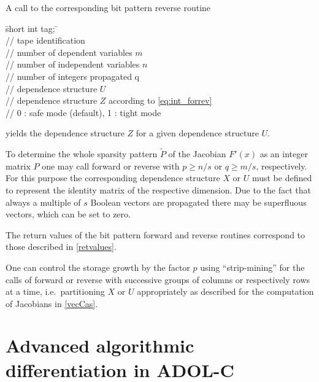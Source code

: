 \documentclass[11pt,twoside]{article}
\begin{document}
A call to the corresponding bit pattern {\sf reverse} routine
%
\begin{tabbing}
\hspace{0.5in}\={\sf short int tag;} \hspace{1.1in}\= \kill    %
\\
         \> // tape identification \\
                 \> // number of dependent variables $m$\\
                 \> // number of independent variables $n$\\
                 \> // number of integers propagated q\\
  \> // dependence structure $U$ \\
  \> // dependence structure $Z$ according
                                     to \eqref{eq:int_forrev}\\
        \> // 0 : safe mode (default), 1 : tight mode
\end{tabbing}
%
yields the dependence structure $Z$ for a given dependence structure
$U$.

To determine the whole sparsity pattern $\tilde{P}$ of the Jacobian $F'(x)$
as an integer matrix $P$ one may call {\sf forward} or {\sf reverse} 
with $p \ge n/s$ or $q \ge m/s$, respectively. For this purpose the 
corresponding dependence structure $X$ or $U$ must be defined to represent  
the identity matrix of the respective dimension.
Due to the fact that always a multiple of $s$ Boolean vectors are propagated
there may be superfluous vectors, which can be set to zero.

The return values of the bit pattern {\sf forward} and {\sf reverse} routines
correspond to those described in \autoref{retvalues}. 

One can control the storage growth by the factor $p$ using
``strip-mining'' for the calls of {\sf forward} or {\sf reverse} with successive
groups of columns or respectively rows at a time, i.e.~partitioning 
$X$ or $U$ appropriately as described for the computation of Jacobians 
in \autoref{vecCas}.
%
%
\section{Advanced algorithmic differentiation in ADOL-C}
\label{adv_ad}
%
\end{document}
